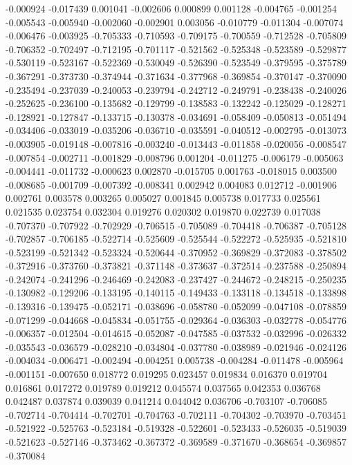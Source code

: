 -0.000924
-0.017439
0.001041
-0.002606
0.000899
0.001128
-0.004765
-0.001254
-0.005543
-0.005940
-0.002060
-0.002901
0.003056
-0.010779
-0.011304
-0.007074
-0.006476
-0.003925
-0.705333
-0.710593
-0.709175
-0.700559
-0.712528
-0.705809
-0.706352
-0.702497
-0.712195
-0.701117
-0.521562
-0.525348
-0.523589
-0.529877
-0.530119
-0.523167
-0.522369
-0.530049
-0.526390
-0.523549
-0.379595
-0.375789
-0.367291
-0.373730
-0.374944
-0.371634
-0.377968
-0.369854
-0.370147
-0.370090
-0.235494
-0.237039
-0.240053
-0.239794
-0.242712
-0.249791
-0.238438
-0.240026
-0.252625
-0.236100
-0.135682
-0.129799
-0.138583
-0.132242
-0.125029
-0.128271
-0.128921
-0.127847
-0.133715
-0.130378
-0.034691
-0.058409
-0.050813
-0.051494
-0.034406
-0.033019
-0.035206
-0.036710
-0.035591
-0.040512
-0.002795
-0.013073
-0.003905
-0.019148
-0.007816
-0.003240
-0.013443
-0.011858
-0.020056
-0.008547
-0.007854
-0.002711
-0.001829
-0.008796
0.001204
-0.011275
-0.006179
-0.005063
-0.004441
-0.011732
-0.000623
0.002870
-0.015705
0.001763
-0.018015
0.003500
-0.008685
-0.001709
-0.007392
-0.008341
0.002942
0.004083
0.012712
-0.001906
0.002761
0.003578
0.003265
0.005027
0.001845
0.005738
0.017733
0.025561
0.021535
0.023754
0.032304
0.019276
0.020302
0.019870
0.022739
0.017038
-0.707370
-0.707922
-0.702929
-0.706515
-0.705089
-0.704418
-0.706387
-0.705128
-0.702857
-0.706185
-0.522714
-0.525609
-0.525544
-0.522272
-0.525935
-0.521810
-0.523199
-0.521342
-0.523324
-0.520644
-0.370952
-0.369829
-0.372083
-0.378502
-0.372916
-0.373760
-0.373821
-0.371148
-0.373637
-0.372514
-0.237588
-0.250894
-0.242074
-0.241296
-0.246469
-0.242083
-0.237427
-0.244672
-0.248215
-0.250235
-0.130982
-0.129206
-0.133195
-0.140115
-0.149433
-0.133118
-0.134518
-0.133898
-0.139316
-0.139475
-0.052171
-0.038696
-0.058780
-0.052099
-0.047108
-0.078859
-0.071299
-0.044668
-0.045834
-0.051755
-0.029364
-0.036303
-0.032778
-0.054776
-0.006357
-0.012504
-0.014615
-0.052087
-0.047585
-0.037532
-0.032996
-0.026332
-0.035543
-0.036579
-0.028210
-0.034804
-0.037780
-0.038989
-0.021946
-0.024126
-0.004034
-0.006471
-0.002494
-0.004251
0.005738
-0.004284
-0.011478
-0.005964
-0.001151
-0.007650
0.018772
0.019295
0.023457
0.019834
0.016370
0.019704
0.016861
0.017272
0.019789
0.019212
0.045574
0.037565
0.042353
0.036768
0.042487
0.037874
0.039039
0.041214
0.044042
0.036706
-0.703107
-0.706085
-0.702714
-0.704414
-0.702701
-0.704763
-0.702111
-0.704302
-0.703970
-0.703451
-0.521922
-0.525763
-0.523184
-0.519328
-0.522601
-0.523433
-0.526035
-0.519039
-0.521623
-0.527146
-0.373462
-0.367372
-0.369589
-0.371670
-0.368654
-0.369857
-0.370084
